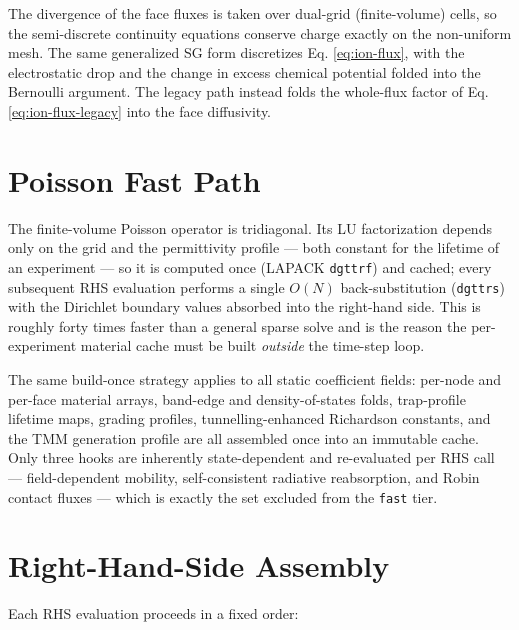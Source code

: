 \documentclass[
  11pt,
  american,
]{report}
\begin{document}
The divergence of the face fluxes is taken over dual-grid
(finite-volume) cells, so the semi-discrete continuity equations
conserve charge exactly on the non-uniform mesh. The same generalized SG
form discretizes Eq. \ref{eq:ion-flux}, with the electrostatic drop and
the change in excess chemical potential folded into the Bernoulli
argument. The legacy path instead folds the whole-flux factor of Eq.
\ref{eq:ion-flux-legacy} into the face diffusivity.

\hypertarget{poisson-fast-path}{%
\section{Poisson Fast Path}\label{poisson-fast-path}}

The finite-volume Poisson operator is tridiagonal. Its LU factorization
depends only on the grid and the permittivity profile --- both constant
for the lifetime of an experiment --- so it is computed once (LAPACK
\texttt{dgttrf}) and cached; every subsequent RHS evaluation performs a
single \(O(N)\) back-substitution (\texttt{dgttrs}) with the Dirichlet
boundary values absorbed into the right-hand side. This is roughly forty
times faster than a general sparse solve and is the reason the
per-experiment material cache must be built \emph{outside} the time-step
loop.

The same build-once strategy applies to all static coefficient fields:
per-node and per-face material arrays, band-edge and density-of-states
folds, trap-profile lifetime maps, grading profiles, tunnelling-enhanced
Richardson constants, and the TMM generation profile are all assembled
once into an immutable cache. Only three hooks are inherently
state-dependent and re-evaluated per RHS call --- field-dependent
mobility, self-consistent radiative reabsorption, and Robin contact
fluxes --- which is exactly the set excluded from the \texttt{fast}
tier.

\hypertarget{right-hand-side-assembly}{%
\section{Right-Hand-Side Assembly}\label{right-hand-side-assembly}}

Each RHS evaluation proceeds in a fixed order:
\end{document}
